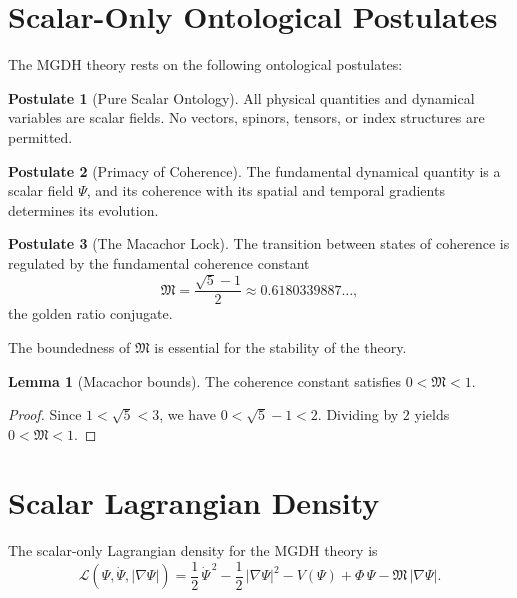 \documentclass[11pt,a4paper]{article}
\theoremstyle{definition}
\newtheorem{postulate}{Postulate}
\newtheorem{lemma}{Lemma}
\theoremstyle{plain}
\newcommand{\M}{\mathfrak{M}}
\newcommand{\Lag}{\mathcal{L}}
\begin{document}
\section{Scalar-Only Ontological Postulates}\label{sec:postulates}

The MGDH theory rests on the following ontological postulates:

\begin{postulate}[Pure Scalar Ontology]
All physical quantities and dynamical variables are scalar fields. No vectors, spinors, tensors, or index structures are permitted.
\end{postulate}

\begin{postulate}[Primacy of Coherence]
The fundamental dynamical quantity is a scalar field $\Psi$, and its coherence with its spatial and temporal gradients determines its evolution.
\end{postulate}

\begin{postulate}[The Macachor Lock]
The transition between states of coherence is regulated by the fundamental coherence constant
\begin{equation}
\M = \frac{\sqrt{5}-1}{2} \approx 0.6180339887\ldots,
\end{equation}
the golden ratio conjugate.
\end{postulate}

\noindent
The boundedness of $\M$ is essential for the stability of the theory.

\begin{lemma}[Macachor bounds]\label{lem:mbounds}
The coherence constant satisfies $0 < \M < 1$.
\end{lemma}
\begin{proof}
Since $1 < \sqrt{5} < 3$, we have $0 < \sqrt{5}-1 < 2$. Dividing by $2$ yields $0 < \M < 1$.
\end{proof}

\section{Scalar Lagrangian Density}\label{sec:lagrangian}

The scalar-only Lagrangian density for the MGDH theory is
\begin{equation}\label{eq:lagrangian}
\Lag(\Psi, \dot{\Psi}, |\nabla\Psi|)
=
\frac{1}{2}\,\dot{\Psi}^{\,2}
-
\frac{1}{2}\,|\nabla\Psi|^{2}
-
V(\Psi)
+
\Phi\,\Psi
-
\M\,|\nabla\Psi|.
\end{equation}
\end{document}
